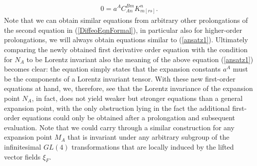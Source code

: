 \documentclass[a4paper,12pt, DIV=14, BCOR=5mm, twoside, headsepline, numbers=noenddot]{scrbook}
\begin{document}
\begin{align}\label{ansatz1}
    0 = a^A C^{Bm}_{An}  K_{m[rs]}^n.
\end{align}
Note that we can obtain similar equations from arbitrary other prolongations of the second equation in (\ref{DiffeoEqnFormal}), in particular also for higher-order prolongations, we will always obtain equations similar to (\ref{ansatz1}). Ultimately comparing the newly obtained first derivative order equation with the condition for $N_A$ to be Lorentz invariant also the meaning of the above equation (\ref{ansatz1}) becomes clear: the equation simply states that the expansion constants $a^A$ must be the components of a Lorentz invariant tensor. With these new first-order equations at hand, we, therefore, see that the Lorentz invariance of the expansion point $N_A$, in fact, does not yield weaker but stronger equations than a general expansion point, with the only obstruction lying in the fact the additional first-order equations could only be obtained after a prolongation and subsequent evaluation. Note that we could carry through a similar construction for any expansion point $M_A$ that is invariant under any arbitrary subgroup of the infinitesimal $GL(4)$ transformations that are locally induced by the lifted vector fields $\xi_F$. 
\end{document}
